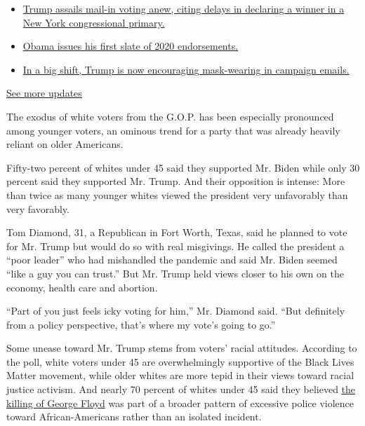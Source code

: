 \begin{itemize}
\tightlist
\item
  \href{https://www.nytimes3xbfgragh.onion/2020/08/03/us/elections/biden-vs-trump.html?action=click\&pgtype=Article\&state=default\&region=MAIN_CONTENT_1\&context=storylines_live_updates\#link-6494b448}{Trump
  assails mail-in voting anew, citing delays in declaring a winner in a
  New York congressional primary.}
\item
  \href{https://www.nytimes3xbfgragh.onion/2020/08/03/us/elections/biden-vs-trump.html?action=click\&pgtype=Article\&state=default\&region=MAIN_CONTENT_1\&context=storylines_live_updates\#link-3de249e6}{Obama
  issues his first slate of 2020 endorsements.}
\item
  \href{https://www.nytimes3xbfgragh.onion/2020/08/03/us/elections/biden-vs-trump.html?action=click\&pgtype=Article\&state=default\&region=MAIN_CONTENT_1\&context=storylines_live_updates\#link-54e34d20}{In
  a big shift, Trump is now encouraging mask-wearing in campaign
  emails.}
\end{itemize}

\href{https://www.nytimes3xbfgragh.onion/2020/08/03/us/elections/biden-vs-trump.html?action=click\&pgtype=Article\&state=default\&region=MAIN_CONTENT_1\&context=storylines_live_updates}{See
more updates}

The exodus of white voters from the G.O.P. has been especially
pronounced among younger voters, an ominous trend for a party that was
already heavily reliant on older Americans.

Fifty-two percent of whites under 45 said they supported Mr. Biden while
only 30 percent said they supported Mr. Trump. And their opposition is
intense: More than twice as many younger whites viewed the president
very unfavorably than very favorably.

Tom Diamond, 31, a Republican in Fort Worth, Texas, said he planned to
vote for Mr. Trump but would do so with real misgivings. He called the
president a ``poor leader'' who had mishandled the pandemic and said Mr.
Biden seemed ``like a guy you can trust.'' But Mr. Trump held views
closer to his own on the economy, health care and abortion.

``Part of you just feels icky voting for him,'' Mr. Diamond said. ``But
definitely from a policy perspective, that's where my vote's going to
go.''

Some unease toward Mr. Trump stems from voters' racial attitudes.
According to the poll, white voters under 45 are overwhelmingly
supportive of the Black Lives Matter movement, while older whites are
more tepid in their views toward racial justice activism. And nearly 70
percent of whites under 45 said they believed
\href{https://www.nytimes3xbfgragh.onion/2020/05/31/us/george-floyd-investigation.html}{the
killing of George Floyd} was part of a broader pattern of excessive
police violence toward African-Americans rather than an isolated
incident.

